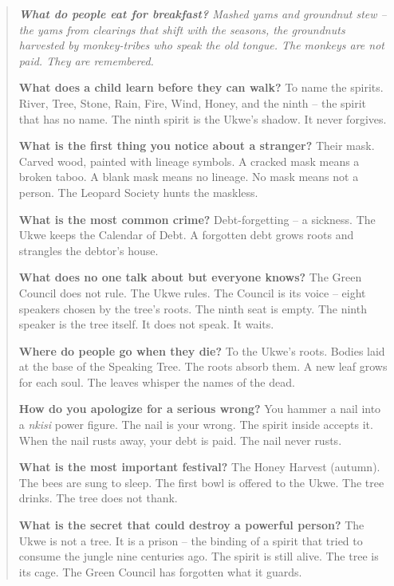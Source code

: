 \documentclass[12pt,oneside]{book}
\newenvironment{almanac}
  {\begin{quote}\small\itshape}
  {\end{quote}}
\begin{document}
\vspace{1em}
\begin{almanac}
\textbf{What do people eat for breakfast?} Mashed yams and groundnut stew -- the yams from clearings that shift with the seasons, the groundnuts harvested by monkey-tribes who speak the old tongue. The monkeys are not paid. They are remembered.

\textbf{What does a child learn before they can walk?} To name the spirits. River, Tree, Stone, Rain, Fire, Wind, Honey, and the ninth -- the spirit that has no name. The ninth spirit is the Ukwe's shadow. It never forgives.

\textbf{What is the first thing you notice about a stranger?} Their mask. Carved wood, painted with lineage symbols. A cracked mask means a broken taboo. A blank mask means no lineage. No mask means not a person. The Leopard Society hunts the maskless.

\textbf{What is the most common crime?} Debt-forgetting -- a sickness. The Ukwe keeps the Calendar of Debt. A forgotten debt grows roots and strangles the debtor's house.

\textbf{What does no one talk about but everyone knows?} The Green Council does not rule. The Ukwe rules. The Council is its voice -- eight speakers chosen by the tree's roots. The ninth seat is empty. The ninth speaker is the tree itself. It does not speak. It waits.

\textbf{Where do people go when they die?} To the Ukwe's roots. Bodies laid at the base of the Speaking Tree. The roots absorb them. A new leaf grows for each soul. The leaves whisper the names of the dead.

\textbf{How do you apologize for a serious wrong?} You hammer a nail into a \textit{nkisi} power figure. The nail is your wrong. The spirit inside accepts it. When the nail rusts away, your debt is paid. The nail never rusts.

\textbf{What is the most important festival?} The Honey Harvest (autumn). The bees are sung to sleep. The first bowl is offered to the Ukwe. The tree drinks. The tree does not thank.

\textbf{What is the secret that could destroy a powerful person?} The Ukwe is not a tree. It is a prison -- the binding of a spirit that tried to consume the jungle nine centuries ago. The spirit is still alive. The tree is its cage. The Green Council has forgotten what it guards.
\end{almanac}

\newpage

\newpage
\end{document}
